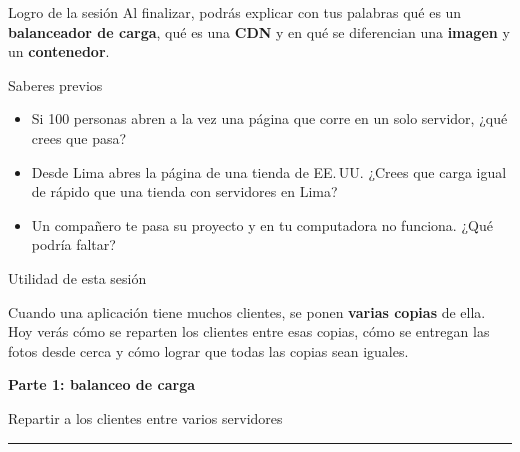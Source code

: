 \documentclass[aspectratio=169,10pt,c]{beamer}
\newcommand{\separador}[2]{%
\begin{frame}[plain]
\vfill
\begin{center}
{\fontsize{29}{34}\selectfont\bfseries #1}\par
\vspace{2mm}
{\small #2}\par
\vspace{4mm}
{\color{utpRojo}\rule{8.5cm}{1.2pt}}
\end{center}
\vfill
\end{frame}}
\begin{document}
\begin{frame}[c]
\begin{block}{Logro de la sesión}
Al finalizar, podrás explicar con tus palabras qué es un \textbf{balanceador de carga}, qué es una \textbf{CDN} y en qué se diferencian una \textbf{imagen} y un \textbf{contenedor}.
\end{block}
\end{frame}

\begin{frame}{Saberes previos}
\begin{itemize}\setlength\itemsep{14pt}
  \item Si 100 personas abren a la vez una página que corre en un solo servidor, ¿qué crees que pasa?
  \item Desde Lima abres la página de una tienda de EE.\,UU. ¿Crees que carga igual de rápido que una tienda con servidores en Lima?
  \item Un compañero te pasa su proyecto y en tu computadora no funciona. ¿Qué podría faltar?
\end{itemize}
\end{frame}

\begin{frame}[c]{Utilidad de esta sesión}
\begin{center}
\begin{minipage}{.84\textwidth}
{\large Cuando una aplicación tiene muchos clientes, se ponen \textbf{varias copias} de ella. Hoy verás cómo se reparten los clientes entre esas copias, cómo se entregan las fotos desde cerca y cómo lograr que todas las copias sean iguales.}
\end{minipage}
\end{center}
\end{frame}

\separador{Parte 1: balanceo de carga}{Repartir a los clientes entre varios servidores}
\end{document}
